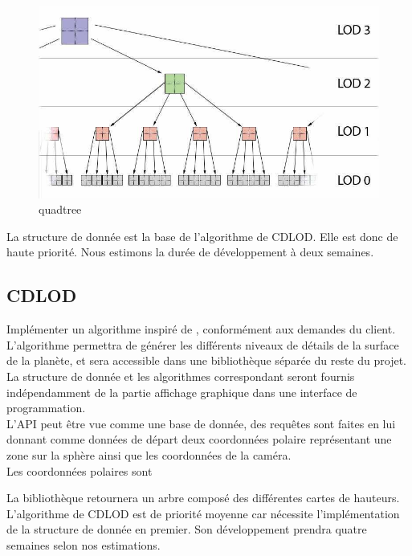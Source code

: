 \documentclass[12pt]{report}
\begin{document}
\begin{figure}[!h]
  \includegraphics[scale=0.5]{img/Quadtree.png}
  \caption{quadtree \cite{CDLOD}}
  \label{fig:quadtree}
\end{figure}

La structure de donnée est la base de l'algorithme de CDLOD. Elle est
donc de haute priorité. Nous estimons la durée de développement à deux
semaines.\\

\subsection{CDLOD}

Implémenter un algorithme inspiré de \cite{CDLOD}, conformément aux
demandes du client.\\
L'algorithme permettra de générer les différents niveaux de détails de
la surface de la planète, et sera accessible dans une bibliothèque
séparée du reste du projet.\\
La structure de donnée et les algorithmes correspondant seront fournis
indépendamment de la partie affichage graphique dans une interface de
programmation.\\
L'API peut être vue comme une base de donnée, des requêtes sont faites
en lui donnant comme données de départ deux coordonnées polaire
représentant une zone sur la sphère ainsi que les coordonnées de la
caméra.\\
Les coordonnées polaires sont 

La bibliothèque retournera un arbre composé des différentes cartes de
hauteurs.\\



L'algorithme de CDLOD est de priorité moyenne car nécessite
l'implémentation de la structure de donnée en premier. Son
développement prendra quatre semaines selon nos estimations.\\
\end{document}
